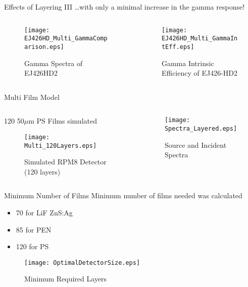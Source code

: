 \begin{frame}{Effects of Layering III}
\dots with only a minimal increase in the gamma response!
\begin{columns}[onlytextwidth]
\begin{column}{0.45\textwidth}
	\tiny
	\begin{figure}
		\centering
		\texttt{[image: EJ426HD\_Multi\_GammaComparison.eps]}
		\caption{Gamma Spectra of EJ426HD2}
	\end{figure}
\end{column}
\begin{column}{0.45\textwidth}
	\tiny
	\begin{figure}
		\centering
		\texttt{[image: EJ426HD\_Multi\_GammaIntEff.eps]}
		\caption{Gamma Intrinsic Efficiency of EJ426-HD2}
\end{figure}
\end{column}
\end{columns}
\end{frame}
\begin{frame}{Multi Film Model}
\begin{columns}[onlytextwidth]
\begin{column}{0.45\textwidth}
\small
120 50$\mu$m PS Films simulated
	\tiny
	\begin{figure}
		\centering
		\texttt{[image: Multi\_120Layers.eps]}
		\caption{Simulated RPM8 Detector (120 layers)}
	\end{figure}
\end{column}
\begin{column}{0.45\textwidth}
	\tiny
	\begin{figure}
		\centering
		\texttt{[image: Spectra\_Layered.eps]}
		\caption{Source and Incident Spectra}
	\end{figure}
\end{column}
\end{columns}
\end{frame}
\begin{frame}{Minimum Number of Films}
	\small
	Minimum number of films needed was calculated
	\tiny
	\begin{itemize}
		\item 70 for LiF ZnS:Ag
		\item 85 for PEN
		\item 120 for PS
	\end{itemize}
	\tiny
	\begin{figure}
		\centering
		\texttt{[image: OptimalDetectorSize.eps]}
		\tiny \caption{Minimum Required Layers}
	\end{figure}
\end{frame}
